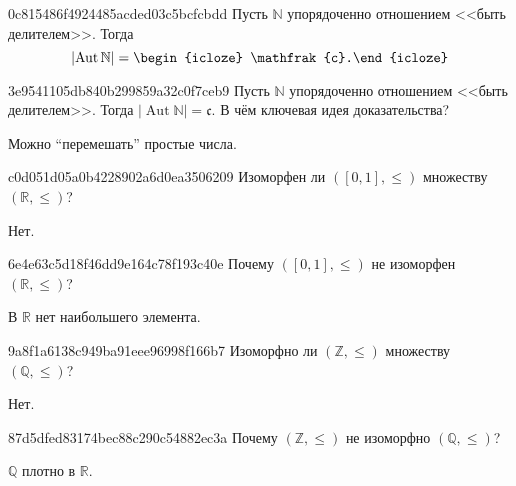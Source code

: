 \begin{note}{0c815486f4924485acded03c5bcfcbdd}
    Пусть \({ \mathbb N }\) упорядоченно отношением <<быть делителем>>.
    Тогда
    \[
        \left\lvert \operatorname{Aut} \mathbb N \right\rvert = \begin{icloze}{1}\mathfrak{c}.\end{icloze}
    \]
\end{note}

\begin{note}{3e9541105db840b299859a32c0f7ceb9}
    Пусть \({ \mathbb N }\) упорядоченно отношением <<быть делителем>>.
    Тогда \({ \left\lvert \operatorname{Aut} \mathbb N \right\rvert = \mathfrak{c} }\).
    В чём ключевая идея доказательства?

    \begin{cloze}{1}
        Можно ``перемешать'' простые числа.
    \end{cloze}
\end{note}

\begin{note}{c0d051d05a0b4228902a6d0ea3506209}
    Изоморфен ли \({ ([0, 1], \leqslant) }\) множеству \({ (\mathbb R, \leqslant) }\)?

    \begin{cloze}{1}
        Нет.
    \end{cloze}
\end{note}

\begin{note}{6e4e63c5d18f46dd9e164c78f193c40e}
    Почему \({ ([0, 1], \leqslant) }\) не изоморфен \({ (\mathbb R, \leqslant) }\)?

    \begin{cloze}{1}
        В \({ \mathbb R }\) нет наибольшего элемента.
    \end{cloze}
\end{note}

\begin{note}{9a8f1a6138c949ba91eee96998f166b7}
    Изоморфно ли \({ (\mathbb Z, \leqslant) }\) множеству \({ (\mathbb Q, \leqslant) }\)?

    \begin{cloze}{1}
        Нет.
    \end{cloze}
\end{note}

\begin{note}{87d5dfed83174bec88c290c54882ec3a}
    Почему \({ (\mathbb Z, \leqslant) }\) не изоморфно \({ (\mathbb Q, \leqslant) }\)?

    \begin{cloze}{1}
        \({ \mathbb Q }\) плотно в \({ \mathbb R }\).
    \end{cloze}
\end{note}

